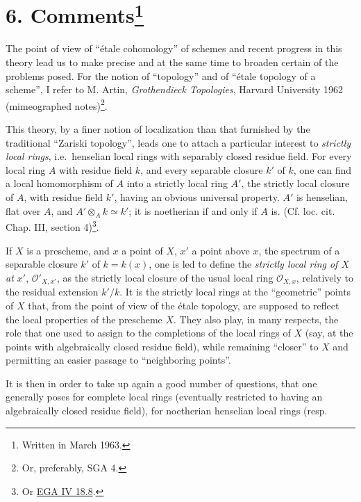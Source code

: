 \documentclass[
  11pt,
  a4paper,
]{book}
\begin{document}
\section[6. Comments]{\texorpdfstring{6.
Comments\footnote{Written in March 1963.}}{6. Comments}}\label{commentsxiii-6-1}

The point of view of ``étale cohomology'' of schemes and recent progress
in this theory lead us to make precise and at the same time to broaden
certain of the problems posed. For the notion of ``topology'' and of
``étale topology of a scheme'', I refer to M. Artin, \emph{Grothendieck
Topologies}, Harvard University 1962 (mimeographed notes)\footnote{Or,
  preferably, SGA 4.}.

This theory, by a finer notion of localization than that furnished by
the traditional ``Zariski topology'', leads one to attach a particular
interest to \emph{strictly local rings}, i.e.~henselian local rings with
separably closed residue field. For every local ring \(A\) with residue
field \(k\), and every separable closure \(k'\) of \(k\), one can find a
local homomorphism of \(A\) into a strictly local ring \(A'\), the
strictly local closure of \(A\), with residue field \(k'\), having an
obvious universal property. \(A'\) is henselian, flat over \(A\), and
\(A' \otimes_{A} k \simeq k'\); it is noetherian if and only if \(A\)
is. (Cf. loc. cit. Chap. III, section 4)\footnote{Or
  \href{https://jcreinhold.github.io/ega/iv/31-ch4-18-complements-etale-morphisms.html\#188-strictly-local-rings-and-strict-henselization}{EGA
  IV 18.8}.}.

If \(X\) is a prescheme, and \(x\) a point of \(X\), \(x'\) a point
above \(x\), the spectrum of a separable closure \(k'\) of \(k =
k(x)\), one is led to define the \emph{strictly local ring of \(X\) at
\(x'\)}, \(\mathcal{O}'_{X,x'}\), as the strictly local closure of the
usual local ring \(\mathcal{O}_{X,x}\), relatively to the residual
extension \(k'/k\). It is the strictly local rings at the ``geometric''
points of \(X\) that, from the point of view of the étale topology, are
supposed to reflect the local properties of the prescheme \(X\). They
also play, in many respects, the role that one used to assign to the
completions of the local rings of \(X\) (say, at the points with
algebraically closed residue field), while remaining ``closer'' to \(X\)
and permitting an easier passage to ``neighboring points''.

It is then in order to take up again a good number of questions, that
one generally poses for complete local rings (eventually restricted to
having an algebraically closed residue field), for noetherian henselian
local rings (resp.
\end{document}
